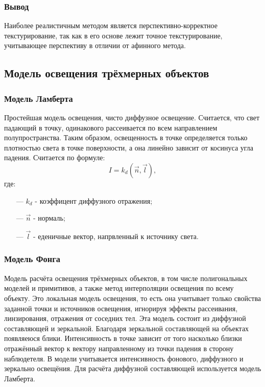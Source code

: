 \subsubsection{Вывод}

Наиболее реалистичным методом является перспективно-корректное текстурирование, так как в его основе лежит точное текстурирование, учитывающее перспективу в отличии от афинного метода.

\subsection{Модель освещения трёхмерных объектов}

\subsubsection{Модель Ламберта}

Простейшая модель освещения, чисто диффузное освещение. Считается, что свет падающий в точку, одинакового рассеивается по всем направлением полупространства. Таким образом, освещенность в точке определяется только плотностью света в точке поверхности, а она линейно зависит от косинуса угла падения. Считается по формуле:
\[
I = k_{d}(\vec{n}, \vec{l}),
\]
где:
\begin{itemize}
	\item[---] $k_{d}$ - коэффицент диффузного отражения;
	\item[---] $\vec{n}$ -  нормаль;
	\item[---] $\vec{l}$ - еденичные вектор, напрвленный к источнику света.
\end{itemize}

\subsubsection{Модель Фонга}

Модель расчёта освещения трёхмерных объектов, в том числе полигональных моделей и примитивов, а также метод интерполяции освещения по всему объекту. Это локальная модель освещения, то есть она учитывает только свойства заданной точки и источников освещения, игнорируя эффекты рассеивания, линзирования, отражения от соседних тел. Эта модель состоит из диффузной составляющей и зеркальной. Благодаря зеркальной составляющей на объектах появляеюся блики. Интенсивность в точке зависит от того насколько близки отражённый вектор к вектору направленному из точки падения в сторону наблюдетеля. В модели учитывается интенсивность фонового, диффузного и зеркально освещёния. Для расчёта диффузной составляющей используется модель Ламберта.\cite{light}

